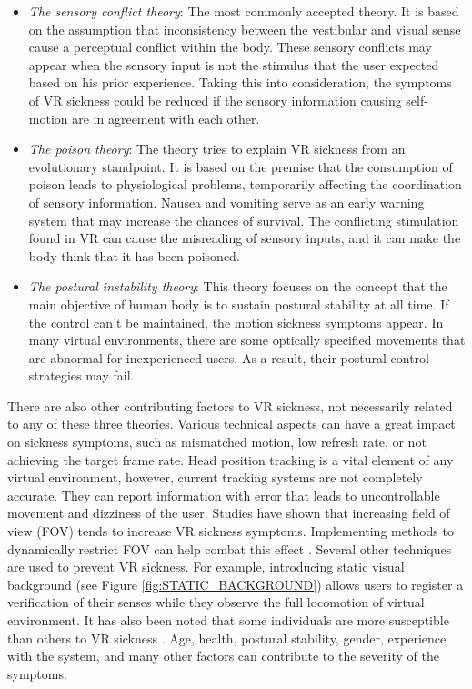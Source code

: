 \begin{itemize}
\item \textit{The sensory conflict theory}: The most commonly accepted theory. It is based on the assumption that inconsistency between the vestibular and visual sense cause a perceptual conflict within the body. These sensory conflicts may appear when the sensory input is not the stimulus that the user expected based on his prior experience. Taking this into consideration, the symptoms of VR sickness could be reduced if the sensory information causing self-motion are in agreement with each other.
\item \textit{The poison theory}: The theory tries to explain VR sickness from an evolutionary standpoint. It is based on the premise that the consumption of poison leads to physiological problems, temporarily affecting the coordination of sensory information. Nausea and vomiting serve as an early warning system that may increase the chances of survival. The conflicting stimulation found in VR can cause the misreading of sensory inputs, and it can make the body think that it has been poisoned.
\item \textit{The postural instability theory}: This theory focuses on the concept that the main objective of human body is to sustain postural stability at all time. If the control can't be maintained, the motion sickness symptoms appear. In many virtual environments, there are some optically specified movements that are abnormal for inexperienced users. As a result, their postural control strategies may fail.
\end{itemize}

There are also other contributing factors to VR sickness, not necessarily related to any of these three theories. Various technical aspects can have a great impact on sickness symptoms, such as mismatched motion, low refresh rate, or not achieving the target frame rate. Head position tracking is a vital element of any virtual environment, however, current tracking systems are not completely accurate. They can report information with error that leads to uncontrollable movement and dizziness of the user. Studies have shown that increasing field of view (FOV) tends to increase VR sickness symptoms. Implementing methods to dynamically restrict FOV can help combat this effect \cite{DYNAMICFOD}. Several other techniques are used to prevent VR sickness. For example, introducing static visual background (see Figure \ref{fig:STATIC_BACKGROUND}) allows users to register a verification of their senses while they observe the full locomotion of virtual environment. It has also been noted that some individuals are more susceptible than others to VR sickness \cite{VRINDIVIDUALS}. Age, health, postural stability, gender, experience with the system, and many other factors can contribute to the severity of the symptoms.

